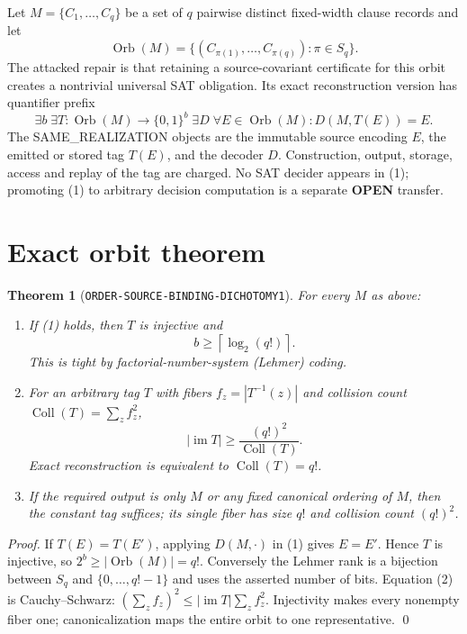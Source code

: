 \documentclass[11pt]{article}
\newcommand{\OPEN}{\textbf{OPEN}}
\newtheorem{theorem}{Theorem}
\begin{document}
Let $M=\{C_1,\ldots,C_q\}$ be a set of $q$ pairwise distinct fixed-width
clause records and let
\[
 \operatorname{Orb}(M)=\{(C_{\pi(1)},\ldots,C_{\pi(q)}):\pi\in S_q\}.
\]
The attacked repair is that retaining a source-covariant certificate for this
orbit creates a nontrivial universal SAT obligation.  Its exact reconstruction
version has quantifier prefix
\begin{equation}
 \exists b\;\exists T:\operatorname{Orb}(M)\to\{0,1\}^b\;
 \exists D\;\forall E\in\operatorname{Orb}(M):
 D(M,T(E))=E.                                                   \tag{1}
\end{equation}
The SAME\_REALIZATION objects are the immutable source encoding $E$, the
emitted or stored tag $T(E)$, and the decoder $D$.  Construction, output,
storage, access and replay of the tag are charged.  No SAT decider appears in
(1); promoting (1) to arbitrary decision computation is a separate \OPEN
transfer.

\section{Exact orbit theorem}

\begin{theorem}[\texttt{ORDER-SOURCE-BINDING-DICHOTOMY1}]
For every $M$ as above:
\begin{enumerate}[leftmargin=1.7em]
\item If (1) holds, then $T$ is injective and
\[
 b\ge \left\lceil\log_2(q!)\right\rceil.
\]
This is tight by factorial-number-system (Lehmer) coding.
\item For an arbitrary tag $T$ with fibers $f_z=|T^{-1}(z)|$ and collision
count $\operatorname{Coll}(T)=\sum_z f_z^2$,
\[
 |\operatorname{im}T|\ge
 \frac{(q!)^2}{\operatorname{Coll}(T)}.                        \tag{2}
\]
Exact reconstruction is equivalent to $\operatorname{Coll}(T)=q!$.
\item If the required output is only $M$ or any fixed canonical ordering of
$M$, then the constant tag suffices; its single fiber has size $q!$ and
collision count $(q!)^2$.
\end{enumerate}
\end{theorem}

\begin{proof}
If $T(E)=T(E')$, applying $D(M,\cdot)$ in (1) gives $E=E'$.  Hence $T$ is
injective, so $2^b\ge|\operatorname{Orb}(M)|=q!$.  Conversely the Lehmer rank
is a bijection between $S_q$ and $\{0,\ldots,q!-1\}$ and uses the asserted
number of bits.  Equation (2) is Cauchy--Schwarz:
$(\sum_z f_z)^2\le |\operatorname{im}T|\sum_z f_z^2$.  Injectivity makes
every nonempty fiber one; canonicalization maps the entire orbit to one
representative.  \qed
\end{proof}
\end{document}
